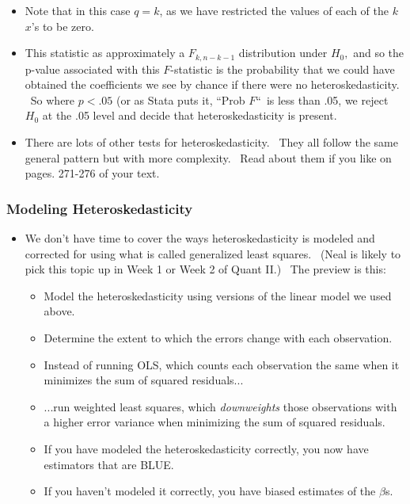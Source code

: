 \documentclass[11pt]{article}
\begin{document}
\begin{itemize}
\item Note that in this case $q=k$, as we have restricted the values of each
of the $k$ $x$'s to be zero.

\item This statistic as approximately a $F_{k,n-k-1}$ distribution under $%
H_{0},$ and so the p-value associated with this $F$-statistic is the
probability that we could have obtained the coefficients we see by chance if
there were no heteroskedasticity. \ So where $p<.05$ (or as Stata puts it,
\textquotedblleft Prob \TEXTsymbol{>} $F$\textquotedblleft\ is less than
.05, we reject $H_{0}$ at the .05 level and decide that heteroskedasticity
is present.

\item There are lots of other tests for heteroskedasticity. \ They all
follow the same general pattern but with more complexity. \ Read about them
if you like on pages. 271-276 of your text.
\end{itemize}

\subsubsection{Modeling Heteroskedasticity}

\begin{itemize}
\item We don't have time to cover the ways heteroskedasticity is modeled and
corrected for using what is called generalized least squares. \ (Neal is
likely to pick this topic up in Week 1 or Week 2 of Quant II.) \ The preview
is this:

\begin{itemize}
\item Model the heteroskedasticity using versions of the linear model we
used above.

\item Determine the extent to which the errors change with each observation.

\item Instead of running OLS, which counts each observation the same when it
minimizes the sum of squared residuals...

\item ...run weighted least squares, which \textit{downweights }those
observations with a higher error variance when minimizing the sum of squared
residuals.

\item If you have modeled the heteroskedasticity correctly, you now have
estimators that are BLUE.

\item If you haven't modeled it correctly, you have biased estimates of the $%
\beta $s.
\end{itemize}
\end{itemize}
\end{document}
